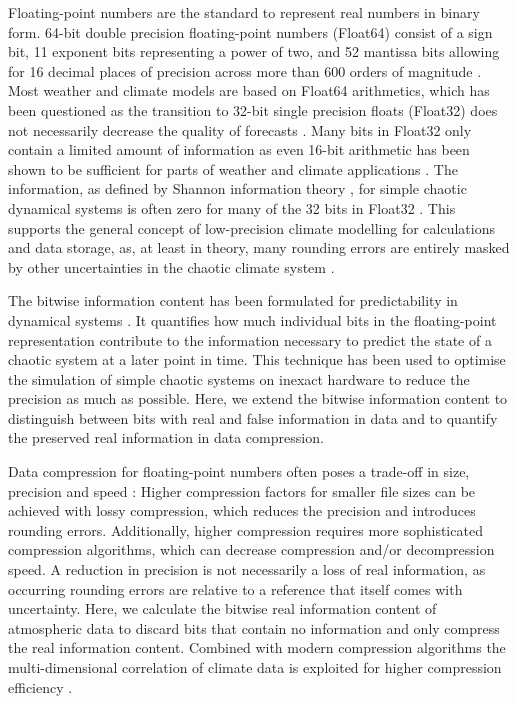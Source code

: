 Floating-point numbers are the standard to represent real numbers in binary form. 64-bit double precision floating-point
numbers (Float64) consist of a sign bit, 11 exponent bits representing a power of two, and 52 mantissa bits allowing for
16 decimal places of precision across more than 600 orders of magnitude \citep{IEEE1985}. Most weather and climate
models are based on Float64 arithmetics, which has been questioned as the transition to 32-bit single precision floats
(Float32) does not necessarily decrease the quality of forecasts \citep{Vana2017,TintoPrims2019}. Many bits in Float32
only contain a limited amount of information as even 16-bit arithmetic has been shown to be sufficient for parts of weather
and climate applications \citep{Hatfield2019,Klower2020a,Ackmann2021,Dawson2018,Fan2019}.
The information, as defined by Shannon information theory \citep{Shannon1948,MacKay2003,Kleeman2011},
for simple chaotic dynamical systems is often zero for many of the 32 bits in Float32 \citep{Jeffress2017}.
This supports the general concept of low-precision climate modelling for calculations and data storage, as, at least in theory,
many rounding errors are entirely masked by other uncertainties in the chaotic climate system
\citep{Palmer2014a,Palmer2015}.

The bitwise information content has been formulated for predictability in dynamical systems \citep{Jeffress2017}.
It quantifies how much individual bits in the floating-point representation contribute to the information necessary
to predict the state of a chaotic system at a later point in time. This technique has been used to optimise the
simulation of simple chaotic systems on inexact hardware to reduce the precision as much as possible. Here, we
extend the bitwise information content to distinguish between bits with real and false information in data and to
quantify the preserved real information in data compression. 

Data compression for floating-point numbers often poses a trade-off in size, precision and speed
\citep{Silver2017,Kuhn2016a,Hubbe2013}:
Higher compression factors for smaller file sizes can be achieved with lossy compression, which reduces
the precision and introduces rounding errors. Additionally, higher compression requires more sophisticated
compression algorithms, which can decrease compression and/or decompression speed. A reduction in
precision is not necessarily a loss of real information, as occurring rounding errors are relative to a reference
that itself comes with uncertainty. Here, we calculate the bitwise real information content \citep{Shannon1948,Jeffress2017,Kleeman2011}
of atmospheric data to discard bits that contain no information \citep{Zender2016,Kouznetsov2020} and only compress the real
information content. Combined with modern compression algorithms \citep{Lindstrom2014,Lindstrom2006} the multi-dimensional
correlation of climate data is exploited for higher compression efficiency \citep{Baker2016,Baker2019,Woodring2011}.

